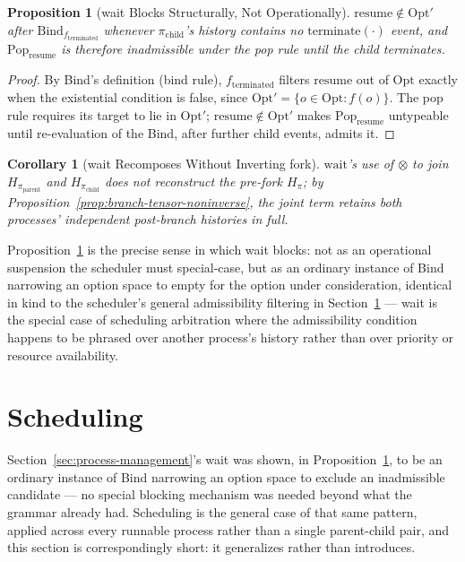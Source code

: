 \documentclass[11pt]{article}
\newtheorem{proposition}{Proposition}[section]
\newtheorem{corollary}{Corollary}[section]
\begin{document}
\begin{proposition}[wait Blocks Structurally, Not Operationally]
\label{prop:wait-blocks}
$\mathrm{resume} \notin \mathrm{Opt}'$ after $\mathrm{Bind}_{f_{\mathrm{terminated}}}$ whenever $\pi_{\mathrm{child}}$'s history contains no $\mathrm{terminate}(\cdot)$ event, and $\mathrm{Pop}_{\mathrm{resume}}$ is therefore inadmissible under the pop rule until the child terminates.
\end{proposition}
\begin{proof}
By Bind's definition (bind rule), $f_{\mathrm{terminated}}$ filters $\mathrm{resume}$ out of $\mathrm{Opt}$ exactly when the existential condition is false, since $\mathrm{Opt}' = \{o \in \mathrm{Opt} : f(o)\}$. The pop rule requires its target to lie in $\mathrm{Opt}'$; $\mathrm{resume} \notin \mathrm{Opt}'$ makes $\mathrm{Pop}_{\mathrm{resume}}$ untypeable until re-evaluation of the Bind, after further child events, admits it.
\end{proof}

\begin{corollary}[wait Recomposes Without Inverting fork]
\label{cor:wait-recomposes}
$\mathrm{wait}$'s use of $\otimes$ to join $H_{\pi_{\mathrm{parent}}}$ and $H_{\pi_{\mathrm{child}}}$ does not reconstruct the pre-fork $H_\pi$; by Proposition~\ref{prop:branch-tensor-noninverse}, the joint term retains both processes' independent post-branch histories in full.
\end{corollary}

Proposition~\ref{prop:wait-blocks} is the precise sense in which wait blocks: not as an operational suspension the scheduler must special-case, but as an ordinary instance of Bind narrowing an option space to empty for the option under consideration, identical in kind to the scheduler's general admissibility filtering in Section~\ref{sec:scheduling} --- wait is the special case of scheduling arbitration where the admissibility condition happens to be phrased over another process's history rather than over priority or resource availability.

\section{Scheduling}
\label{sec:scheduling}

Section~\ref{sec:process-management}'s wait was shown, in Proposition~\ref{prop:wait-blocks}, to be an ordinary instance of Bind narrowing an option space to exclude an inadmissible candidate --- no special blocking mechanism was needed beyond what the grammar already had. Scheduling is the general case of that same pattern, applied across every runnable process rather than a single parent-child pair, and this section is correspondingly short: it generalizes rather than introduces.
\end{document}
